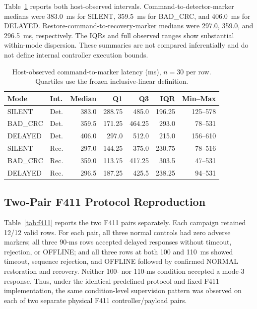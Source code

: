 \documentclass[conference]{IEEEtran}
\begin{document}
Table~\ref{tab:latency} reports both host-observed intervals. Command-to-detector-marker medians were 383.0~ms for SILENT, 359.5~ms for BAD\_CRC, and 406.0~ms for DELAYED. Restore-command-to-recovery-marker medians were 297.0, 359.0, and 296.5~ms, respectively. The IQRs and full observed ranges show substantial within-mode dispersion. These summaries are not compared inferentially and do not define internal controller execution bounds.

\begin{table}[t]
\caption{Host-observed command-to-marker latency (ms), $n=30$ per row. Quartiles use the frozen inclusive-linear definition.}
\label{tab:latency}
\centering
\scriptsize
\begin{tabular}{@{}llrrrrr@{}}
\toprule
Mode & Int. & Median & Q1 & Q3 & IQR & Min--Max \\
\midrule
SILENT & Det. & 383.0 & 288.75 & 485.0 & 196.25 & 125--578 \\
BAD\_CRC & Det. & 359.5 & 171.25 & 464.25 & 293.0 & 78--531 \\
DELAYED & Det. & 406.0 & 297.0 & 512.0 & 215.0 & 156--610 \\
\midrule
SILENT & Rec. & 297.0 & 144.25 & 375.0 & 230.75 & 78--516 \\
BAD\_CRC & Rec. & 359.0 & 113.75 & 417.25 & 303.5 & 47--531 \\
DELAYED & Rec. & 296.5 & 187.25 & 425.5 & 238.25 & 94--531 \\
\bottomrule
\end{tabular}
\end{table}

\subsection{Two-Pair F411 Protocol Reproduction}

Table~\ref{tab:f411} reports the two F411 pairs separately. Each campaign retained 12/12 valid rows. For each pair, all three normal controls had zero adverse markers; all three 90-ms rows accepted delayed responses without timeout, rejection, or OFFLINE; and all three rows at both 100 and 110~ms showed timeout, sequence rejection, and OFFLINE followed by confirmed NORMAL restoration and recovery. Neither 100- nor 110-ms condition accepted a mode-3 response. Thus, under the identical predefined protocol and fixed F411 implementation, the same condition-level supervision pattern was observed on each of two separate physical F411 controller/payload pairs.
\end{document}
